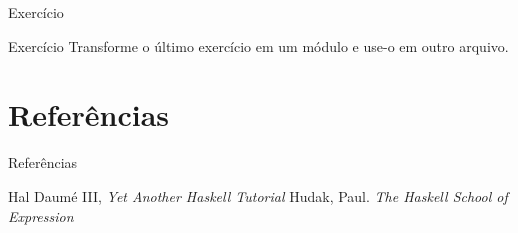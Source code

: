\documentclass{beamer}
\begin{document}
			\begin{frame}{Exercício}
			 \begin{block}{Exercício}
			  Transforme o último exercício em um módulo e use-o em outro arquivo.
			 \end{block}
			\end{frame}

			
\section{Referências}
\begin{frame}{Referências}
	\begin{thebibliography}{9}
	 Hal Daumé III, \textit{Yet Another Haskell Tutorial}
	 Hudak, Paul. \textit{The Haskell School of Expression}
	\end{thebibliography}
\end{frame}
	
	
\end{document}
